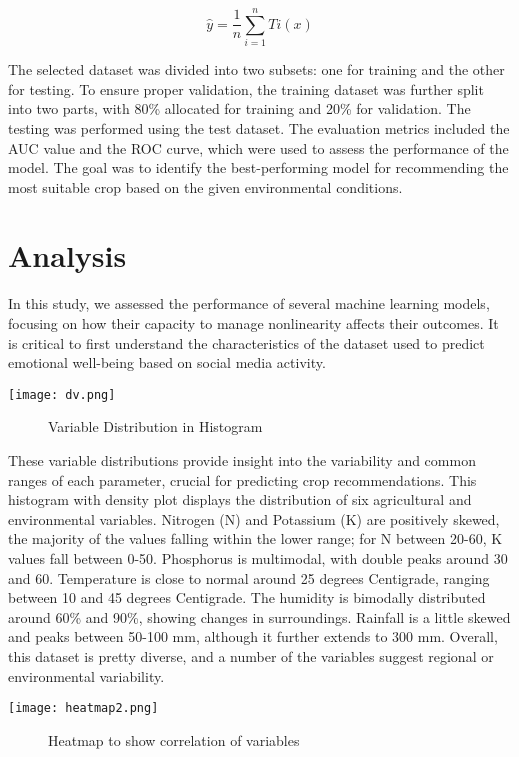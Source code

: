 \documentclass[conference]{IEEEtran}
\begin{document}
\begin{equation}
   \widehat{y}=\frac{1}{n} \sum_{i=1}^n T i(x)
\end{equation}

The selected dataset was divided into two subsets: one for training and the other for testing. To ensure proper validation, the training dataset was further split into two parts, with 80\% allocated for training and 20\% for validation. The testing was performed using the test dataset. The evaluation metrics included the AUC value and the ROC curve, which were used to assess the performance of the model. The goal was to identify the best-performing model for recommending the most suitable crop based on the given environmental conditions.

\section{Analysis}
In this study, we assessed the performance of several machine learning models, focusing on how their capacity to manage nonlinearity affects their outcomes. It is critical to first understand the characteristics of the dataset used to predict emotional well-being based on social media activity. 

\centerline{\texttt{[image: dv.png]}}
\begin{figure}[h]

\caption{Variable Distribution in Histogram}
\end{figure}

These variable distributions provide insight into the variability and common ranges of each parameter, crucial for predicting crop recommendations. This histogram with density plot displays the distribution of six agricultural and environmental variables. Nitrogen (N) and Potassium (K) are positively skewed, the majority of the values falling within the lower range; for N between 20-60, K values fall between 0-50. Phosphorus is multimodal, with double peaks around 30 and 60. Temperature is close to normal around 25 degrees Centigrade, ranging between 10 and 45 degrees Centigrade. The humidity is bimodally distributed around 60\% and 90\%, showing changes in surroundings. Rainfall is a little skewed and peaks between 50-100 mm, although it further extends to 300 mm. Overall, this dataset is pretty diverse, and a number of the variables suggest regional or environmental variability.

\centerline{\texttt{[image: heatmap2.png]}}
\begin{figure}[h]

\caption{Heatmap to show correlation of variables}
\end{figure}
\end{document}
